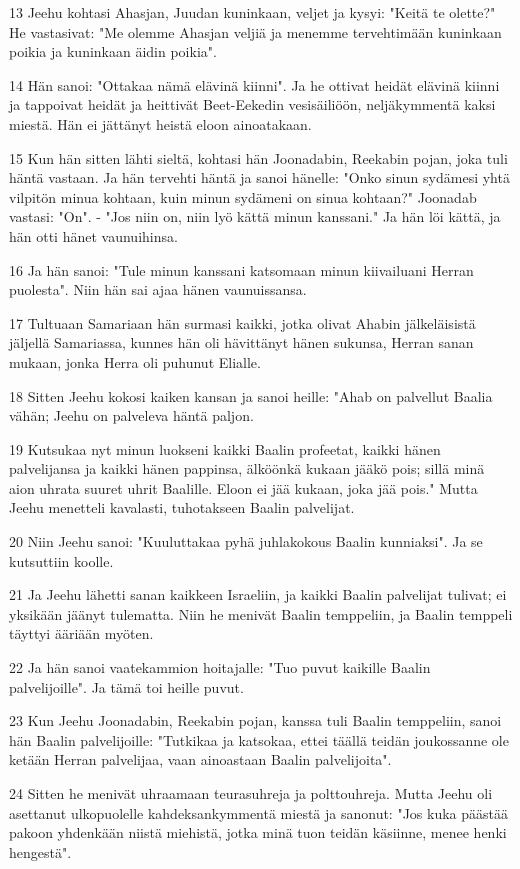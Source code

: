 \par 13 Jeehu kohtasi Ahasjan, Juudan kuninkaan, veljet ja kysyi: "Keitä te olette?" He vastasivat: "Me olemme Ahasjan veljiä ja menemme tervehtimään kuninkaan poikia ja kuninkaan äidin poikia".
\par 14 Hän sanoi: "Ottakaa nämä elävinä kiinni". Ja he ottivat heidät elävinä kiinni ja tappoivat heidät ja heittivät Beet-Eekedin vesisäiliöön, neljäkymmentä kaksi miestä. Hän ei jättänyt heistä eloon ainoatakaan.
\par 15 Kun hän sitten lähti sieltä, kohtasi hän Joonadabin, Reekabin pojan, joka tuli häntä vastaan. Ja hän tervehti häntä ja sanoi hänelle: "Onko sinun sydämesi yhtä vilpitön minua kohtaan, kuin minun sydämeni on sinua kohtaan?" Joonadab vastasi: "On". - "Jos niin on, niin lyö kättä minun kanssani." Ja hän löi kättä, ja hän otti hänet vaunuihinsa.
\par 16 Ja hän sanoi: "Tule minun kanssani katsomaan minun kiivailuani Herran puolesta". Niin hän sai ajaa hänen vaunuissansa.
\par 17 Tultuaan Samariaan hän surmasi kaikki, jotka olivat Ahabin jälkeläisistä jäljellä Samariassa, kunnes hän oli hävittänyt hänen sukunsa, Herran sanan mukaan, jonka Herra oli puhunut Elialle.
\par 18 Sitten Jeehu kokosi kaiken kansan ja sanoi heille: "Ahab on palvellut Baalia vähän; Jeehu on palveleva häntä paljon.
\par 19 Kutsukaa nyt minun luokseni kaikki Baalin profeetat, kaikki hänen palvelijansa ja kaikki hänen pappinsa, älköönkä kukaan jääkö pois; sillä minä aion uhrata suuret uhrit Baalille. Eloon ei jää kukaan, joka jää pois." Mutta Jeehu menetteli kavalasti, tuhotakseen Baalin palvelijat.
\par 20 Niin Jeehu sanoi: "Kuuluttakaa pyhä juhlakokous Baalin kunniaksi". Ja se kutsuttiin koolle.
\par 21 Ja Jeehu lähetti sanan kaikkeen Israeliin, ja kaikki Baalin palvelijat tulivat; ei yksikään jäänyt tulematta. Niin he menivät Baalin temppeliin, ja Baalin temppeli täyttyi ääriään myöten.
\par 22 Ja hän sanoi vaatekammion hoitajalle: "Tuo puvut kaikille Baalin palvelijoille". Ja tämä toi heille puvut.
\par 23 Kun Jeehu Joonadabin, Reekabin pojan, kanssa tuli Baalin temppeliin, sanoi hän Baalin palvelijoille: "Tutkikaa ja katsokaa, ettei täällä teidän joukossanne ole ketään Herran palvelijaa, vaan ainoastaan Baalin palvelijoita".
\par 24 Sitten he menivät uhraamaan teurasuhreja ja polttouhreja. Mutta Jeehu oli asettanut ulkopuolelle kahdeksankymmentä miestä ja sanonut: "Jos kuka päästää pakoon yhdenkään niistä miehistä, jotka minä tuon teidän käsiinne, menee henki hengestä".
